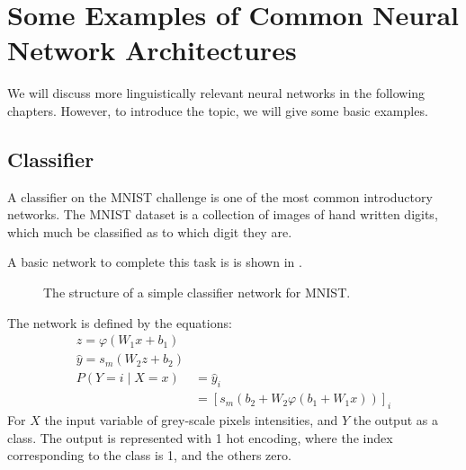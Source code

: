 \documentclass[12pt,parskip]{komatufte}\right
\begin{document}
\section{Some Examples of Common Neural Network Architectures}

We will discuss more linguistically relevant neural networks in the following chapters.
However, to introduce the topic, we will give some basic examples.


\subsection{Classifier}\label{sec:classifier}

A classifier on the MNIST challenge is one of the most common introductory networks.
The MNIST dataset is a collection of images of hand written digits, which much be classified as to which digit they are.

A basic network to complete this task is is shown in .

\begin{figure}
	\caption{The structure of a simple classifier network for MNIST.}
	\label{fig:mnistnetwork}
	
\end{figure}

The network is defined by the equations:
\begin{align}
z=\varphi(W_1 x+b_1) \\
\hat{y}=s_m(W_2 z + b_2) \\
P(Y=i\mid X=x) &= \hat{y}_i \\
&= \left[s_m(b_2 + W_2 \varphi(b_1 + W_1 x))\right]_i
\end{align}
For $X$ the input variable of grey-scale pixels intensities, and $Y$ the output as a class.
The output is represented with 1 hot encoding, where the index corresponding to the class is 1, and the others zero.
\end{document}

